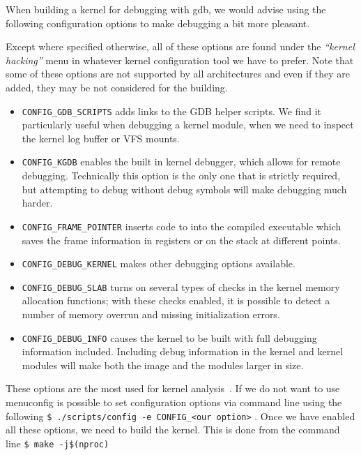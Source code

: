\documentclass{masterthesis}
\begin{document}
When building a kernel for debugging with gdb, we would advise using the following configuration options to make debugging a bit more pleasant. 

Except where specified otherwise, all of these options are found under the \emph{``kernel hacking''} menu in whatever kernel configuration tool we have to prefer. Note that some of these options are not supported by all architectures and even if they are added, they may be not considered for the building.
\begin{itemize}
\item \texttt{CONFIG\_GDB\_SCRIPTS} adds links to the GDB helper scripts. We find it particularly useful when debugging a kernel module, when we need to inspect the kernel log buffer or VFS mounts.

\item \texttt{CONFIG\_KGDB} enables the built in kernel debugger, which allows for remote debugging. Technically this option is the only one that is strictly required, but attempting to debug without debug symbols will make debugging much harder.

\item \texttt{CONFIG\_FRAME\_POINTER} inserts code to into the compiled executable which saves the frame information in registers or on the stack at different points.

\item \texttt{CONFIG\_DEBUG\_KERNEL} makes other debugging options available.

\item \texttt{CONFIG\_DEBUG\_SLAB} turns on several types of checks in the kernel memory allocation functions; with these checks enabled, it is possible to detect a number of memory overrun and missing initialization errors.

\item \texttt{CONFIG\_DEBUG\_INFO} causes the kernel to be built with full debugging information included. Including debug information in the kernel and kernel modules will make both the image and the modules larger in size.
\end{itemize}
These options are the most used for kernel analysis~\cite{kernel_analysis}.
If we do not want to use menuconfig is possible to set configuration options via command line using the following
\lstinline{$ ./scripts/config -e CONFIG_<our option>} .
Once we have enabled all these options, we need to build the kernel.
This is done from the command line \lstinline{$ make -j$(nproc)}
\end{document}
